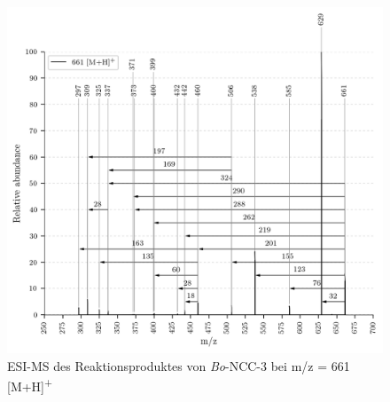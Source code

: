 \begin{figure}[!htbp]
  \centering
  \includegraphics[width=\textwidth, height=0.7\textwidth]{figures/Kapitel7/Kataboliten/VWA_MS_661.png}
  \caption[ESI-MS des Reaktionsproduktes von \textit{Bo}-NCC-3, Quelle: Author]{ESI-MS des Reaktionsproduktes von \textit{Bo}-NCC-3 bei m/z = 661 [M+H]\textsuperscript{+}}
  \label{fig:661MH}
\end{figure}


